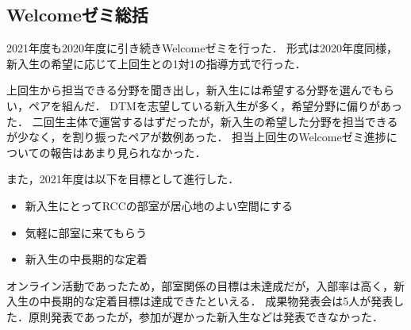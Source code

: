 \subsection*{Welcomeゼミ総括}


2021年度も2020年度に引き続きWelcomeゼミを行った．
形式は2020年度同様，新入生の希望に応じて上回生との1対1の指導方式で行った．

上回生から担当できる分野を聞き出し，新入生には希望する分野を選んでもらい，ペアを組んだ．
DTMを志望している新入生が多く，希望分野に偏りがあった．
二回生主体で運営するはずだったが，新入生の希望した分野を担当できる\secondGrade{}が少なく，\thirdGrade{}を割り振ったペアが数例あった．
担当上回生のWelcomeゼミ進捗についての報告はあまり見られなかった．

また，2021年度は以下を目標として進行した．
\begin{itemize}
	\item 新入生にとってRCCの部室が居心地のよい空間にする
	\item 気軽に部室に来てもらう
	\item 新入生の中長期的な定着
\end{itemize}

オンライン活動であったため，部室関係の目標は未達成だが，入部率は高く，新入生の中長期的な定着目標は達成できたといえる．
成果物発表会は5人が発表した．原則発表であったが，参加が遅かった新入生などは発表できなかった．
